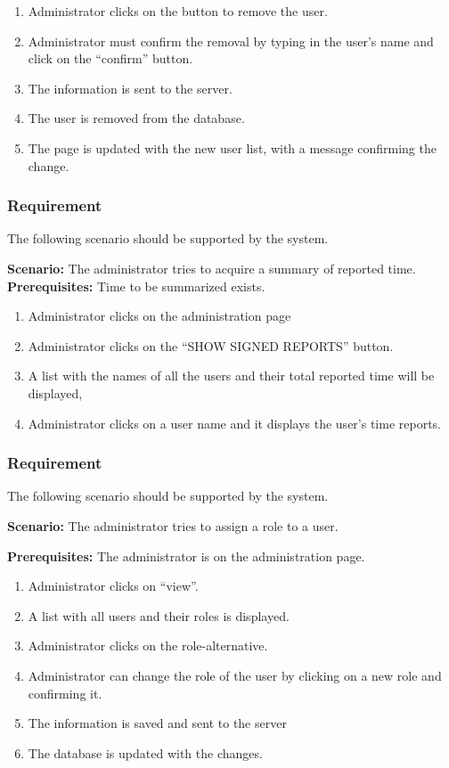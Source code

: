 \documentclass{article}
\begin{document}
\begin{enumerate}
    \item Administrator clicks on the button to remove the user.
    \item Administrator must confirm the removal by typing in the user’s name and click on the “confirm” button.
    \item The information is sent to the server.
    \item The user is removed from the database.
    \item The page is updated with the new user list, with a message confirming the change.
\end{enumerate}


\subsubsection{Requirement}
The following scenario should be supported by the system.

\textbf{Scenario:} The administrator tries to acquire a summary of reported time.
\textbf{Prerequisites:} Time to be summarized exists.

\begin{enumerate}
    \item Administrator clicks on the administration page 
    \item Administrator clicks on the “SHOW SIGNED REPORTS” button.
    \item A list with the names of all the users and their total reported time will be displayed,
    \item Administrator clicks on a user name and it displays the user’s time reports.
\end{enumerate}

\subsubsection{Requirement}
The following scenario should be supported by the system.

\textbf{Scenario:} The administrator tries to assign a role to a user.

\textbf{Prerequisites:} The administrator is on the administration page.

\begin{enumerate}
    \item Administrator clicks on “view”.
    \item A list with all users and their roles is displayed.
    \item Administrator clicks on the role-alternative.
    \item Administrator can change the role of the user by clicking on a new role and confirming it.
    \item The information is saved and sent to the server
    \item The database is updated with the changes.
\end{enumerate}
\end{document}
